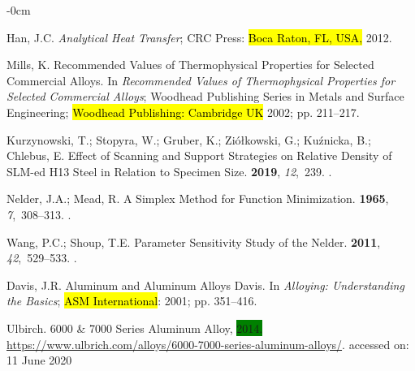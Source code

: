 \documentclass[metals,article,accept,pdftex,moreauthors]{Definitions/mdpi}
\begin{document}
\begin{adjustwidth}{-\extralength}{0cm}
\begin{thebibliography}{999}
Han, J.C.
{\em Analytical Heat Transfer}; CRC Press:  \hl{Boca Raton, FL, USA,} %
2012.

Mills, K.
Recommended Values of Thermophysical Properties for Selected Commercial Alloys. 
In {\em Recommended Values of Thermophysical Properties for Selected Commercial Alloys}; 
Woodhead Publishing Series in Metals and Surface Engineering; 
\hl{Woodhead Publishing: Cambridge UK} 2002; pp. 211--217.

Kurzynowski, T.; Stopyra, W.; Gruber, K.; Zi{\'o}{\l}kowski, G.; Ku{\'z}nicka,
  B.; Chlebus, E.
\newblock Effect of {{Scanning}} and {{Support Strategies}} on {{Relative
  Density}} of {{SLM-ed H13 Steel}} in {{Relation}} to {{Specimen Size}}.
 {\bf 2019}, {\em 12},~239.
.

Nelder, J.A.; Mead, R.
\newblock A {{Simplex Method}} for {{Function Minimization}}.
 {\bf 1965}, {\em 7},~308--313.
.

Wang, P.C.; Shoup, T.E.
\newblock Parameter Sensitivity Study of the {{Nelder}}.
 {\bf 2011}, {\em
  42},~529--533.
.

Davis, J.R.
Aluminum and Aluminum Alloys Davis. 
In {\em Alloying: Understanding the Basics}; \hl{ASM International}: 2001; pp. 351--416.

Ulbirch. 6000 \& 7000 {{Series Aluminum Alloy}}, \colorbox{green}{2014.} %
{\url{https://www.ulbrich.com/alloys/6000-7000-series-aluminum-alloys/}}.
{accessed on: 11 June 2020}


\end{thebibliography}
\end{adjustwidth}
\end{document}
